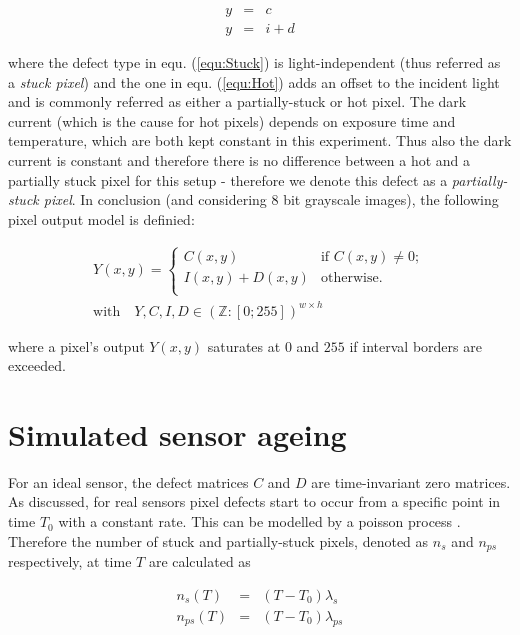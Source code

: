 \documentclass[10pt,twocolumn,letterpaper]{article}
\begin{document}
\begin{eqnarray}
  y & = & c \label{equ:Stuck} \\
  y & = & i + d \label{equ:Hot}
\end{eqnarray}
  
where the defect type in equ. (\ref{equ:Stuck}) is light-independent (thus referred as a \emph{stuck pixel}) and the one in equ. (\ref{equ:Hot}) adds an offset to the incident light and is commonly referred as either a partially-stuck or hot pixel. The dark current (which is the cause for hot pixels) depends on exposure time and temperature, which are both kept constant in this experiment. Thus also the dark current is constant and therefore there is no difference between a hot and a partially stuck pixel for this setup - therefore we denote this defect as a \emph{partially-stuck pixel}. In conclusion (and considering 8 bit grayscale images), the following pixel output model is definied:

\begin{equation}
\begin{aligned}
Y({x,y}) = \begin{cases}
C({x,y})  & \text{if $C({x,y}) \neq 0$}; \\
I({x,y}) +D({x,y})  & \text{otherwise}.\\
\end{cases} \\ \text{with} \quad Y,C,I,D \in {(\mathbb{Z}:[0;255])}^{w \times h}
\label{equ:finalPixelModel}
\end{aligned} 
\end{equation}

where a pixel's output $Y({x,y})$ saturates at $0$ and $255$ if interval borders are exceeded.

\section{Simulated sensor ageing}
\label{virtualAging}
For an ideal sensor, the defect matrices $C$ and $D$ are time-invariant zero matrices. As discussed, for real sensors pixel defects start to occur from a specific point in time $T_0$ with a constant rate. This can be modelled by a poisson process \cite{fridrich}. Therefore the number of stuck and partially-stuck pixels, denoted as $n_{s}$ and $n_{ps}$ respectively, at time $T$ are calculated as

\begin{eqnarray}
   n_s(T)  & = & (T-T_0) \lambda_s \\
  n_{ps}(T) & = &  (T-T_0) \lambda_{ps}
\end{eqnarray}
\end{document}

